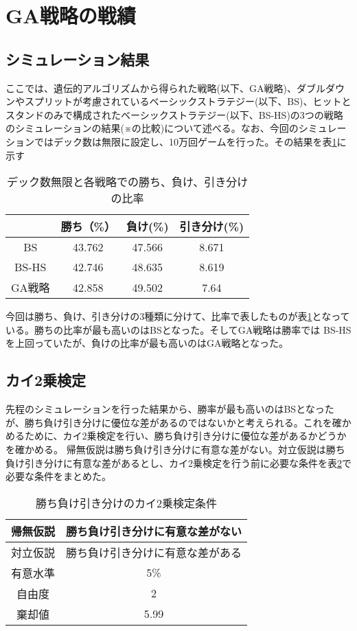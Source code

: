 \section{GA戦略の戦績}
\subsection{シミュレーション結果}
ここでは、遺伝的アルゴリズムから得られた戦略(以下、GA戦略)、ダブルダウンやスプリットが考慮されているベーシックストラテジー(以下、BS)、ヒットとスタンドのみで構成されたベーシックストラテジー(以下、BS-HS)の3つの戦略のシミュレーションの結果(※の比較)について述べる。なお、今回のシミュレーションではデック数は無限に設定し、10万回ゲームを行った。その結果を表\ref{tab:score}に示す

\begin{table}[H]
 \caption{デック数無限と各戦略での勝ち、負け、引き分けの比率}
 \begin{center}
  \begin{tabular}{|c|c|c|c|}
  \hline   & 勝ち（\%） & 負け(\%)  & 引き分け(\%) \\
  \hline BS & 43.762 & 47.566 & 8.671 \\
  \hline BS-HS & 42.746 & 48.635 & 8.619 \\
  \hline GA戦略 & 42.858 & 49.502 & 7.64 \\
  \hline
  \end{tabular}
  \label{tab:score}
 \end{center}
\end{table}

今回は勝ち、負け、引き分けの3種類に分けて、比率で表したものが表\ref{tab:score}となっている。勝ちの比率が最も高いのはBSとなった。そしてGA戦略は勝率では BS-HSを上回っていたが、負けの比率が最も高いのはGA戦略となった。

\subsection{カイ2乗検定}
先程のシミュレーションを行った結果から、勝率が最も高いのはBSとなったが、勝ち負け引き分けに優位な差があるのではないかと考えられる。これを確かめるために、カイ2乗検定を行い、勝ち負け引き分けに優位な差があるかどうかを確かめる。
帰無仮説は勝ち負け引き分けに有意な差がない。対立仮説は勝ち負け引き分けに有意な差があるとし、カイ2乗検定を行う前に必要な条件を表\ref{score-x}で必要な条件をまとめた。
\begin{table}[H]
 \caption{勝ち負け引き分けのカイ2乗検定条件\label{score-x}}
 \begin{center}
  \begin{tabular}{|c|c|}
  \hline 帰無仮説 & 勝ち負け引き分けに有意な差がない \\
  \hline 対立仮説 & 勝ち負け引き分けに有意な差がある \\
  \hline 有意水準 & 5\% \\
  \hline 自由度 & 2 \\
  \hline 棄却値 & 5.99 \\
  \hline
  \end{tabular}
 \end{center}
\end{table}

